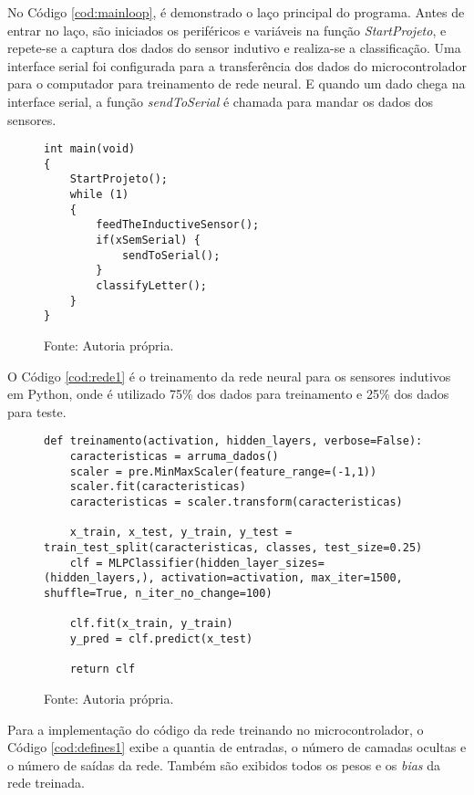 No Código \ref{cod:mainloop}, é demonstrado o laço principal do programa. Antes de entrar no laço, são iniciados os periféricos e variáveis na função \textit{StartProjeto},  e repete-se a captura dos dados do sensor indutivo e realiza-se a classificação. Uma interface serial foi configurada para a transferência dos dados do microcontrolador para o computador para treinamento de rede neural. E quando um dado chega na interface serial, a função \textit{sendToSerial} é chamada para mandar os dados dos sensores.

\begin{figure}[H]
\begin{lstlisting}[style=CStyle, breaklines, frame=single, caption=Laço principal do \textit{firmware},  label=cod:mainloop]
int main(void) 
{
	StartProjeto();
	while (1)
	{
		feedTheInductiveSensor();
		if(xSemSerial) {
			sendToSerial();
		}
		classifyLetter();
	}
}
\end{lstlisting}
\caption*{Fonte: Autoria própria.}
\end{figure}

O Código \ref{cod:rede1} é o treinamento da rede neural para os sensores indutivos em Python, onde é utilizado 75\% dos dados para treinamento e 25\% dos dados para teste.
\begin{figure}[H]
\begin{lstlisting}[breaklines, frame=single, caption=Treinamento da rede neural dos sensores indutivos em Python, style=CStyle, label=cod:rede1]
def treinamento(activation, hidden_layers, verbose=False):
	caracteristicas = arruma_dados()
	scaler = pre.MinMaxScaler(feature_range=(-1,1))
	scaler.fit(caracteristicas)
	caracteristicas = scaler.transform(caracteristicas)
	
	x_train, x_test, y_train, y_test = train_test_split(caracteristicas, classes, test_size=0.25)
	clf = MLPClassifier(hidden_layer_sizes=(hidden_layers,), activation=activation, max_iter=1500, shuffle=True, n_iter_no_change=100)
	
	clf.fit(x_train, y_train)
	y_pred = clf.predict(x_test)
	
	return clf
\end{lstlisting}
\caption*{Fonte: Autoria própria.}
\end{figure}

Para a implementação do código da rede treinando no microcontrolador, o Código \ref{cod:defines1} exibe a quantia de entradas, o número de camadas ocultas e o número de saídas da rede. Também são exibidos todos os pesos e os \textit{bias} da rede treinada.

